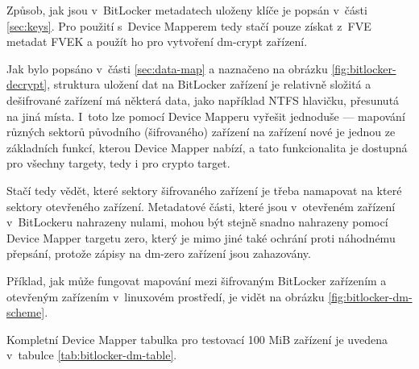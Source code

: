 Způsob, jak jsou v~BitLocker metadatech uloženy klíče je popsán v~části \ref{sec:keys}. Pro použití s~Device Mapperem tedy stačí pouze získat z~FVE metadat FVEK a použít ho pro vytvoření dm-crypt zařízení.


Jak bylo popsáno v~části \ref{sec:data-map} a naznačeno na obrázku \ref{fig:bitlocker-decrypt}, struktura uložení dat na BitLocker zařízení je relativně složitá a dešifrované zařízení má některá data, jako například NTFS hlavičku, přesunutá na jiná místa. I~toto lze pomocí Device Mapperu vyřešit jednoduše --- mapování různých sektorů původního (šifrovaného) zařízení na zařízení nové je jednou ze základních funkcí, kterou Device Mapper nabízí, a tato funkcionalita je dostupná pro všechny targety, tedy i pro crypto target.

Stačí tedy vědět, které sektory šifrovaného zařízení je třeba namapovat na které sektory otevřeného zařízení. Metadatové části, které jsou v~otevřeném zařízení v~BitLockeru nahrazeny nulami, mohou být stejně snadno nahrazeny pomocí Device Mapper targetu zero, který je mimo jiné také ochrání proti náhodnému přepsání, protože zápisy na dm-zero zařízení jsou zahazovány\cite{KernelZero}.

Příklad, jak může fungovat mapování mezi šifrovaným BitLocker zařízením a otev\-ře\-ným zařízením v~linuxovém prostředí, je vidět na obrázku \ref{fig:bitlocker-dm-scheme}.

Kompletní Device Mapper tabulka pro testovací 100 MiB zařízení je uvedena v~tabulce \ref{tab:bitlocker-dm-table}.


